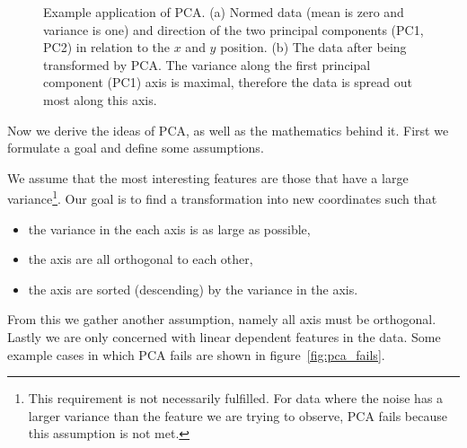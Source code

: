 \begin{figure}
	\centering
	\begin{subfigure}{0.45\linewidth}
		
		\caption{}
		\label{fig:some_nice_data_pc}
	\end{subfigure}
	\hfill
	\begin{subfigure}{0.45\linewidth}
		
		\caption{}
		\label{fig:some_nice_data_pca}
	\end{subfigure}
	
	\caption{Example application of PCA. \newline (a) Normed data (mean is zero and variance is one) and direction of the two principal components (PC1, PC2) in relation to the $x$ and $y$ position. \newline (b) The data after being transformed by PCA. The variance along the first principal component (PC1) axis is maximal, therefore the data is spread out most along this axis.}
	\label{fig:pca_example}
\end{figure}

Now we derive the ideas of PCA, as well as the mathematics behind it. First we formulate a goal and define some assumptions.

We assume that the most interesting features are those that have a large variance\footnote{This requirement is not necessarily fulfilled. For data where the noise has a larger variance than the feature we are trying to observe, PCA fails because this assumption is not met.}. Our goal is to find a transformation into new coordinates such that
\begin{itemize}
	\item the variance in the each axis is as large as possible,
	\item the axis are all orthogonal to each other,
	\item the axis are sorted (descending) by the variance in the axis.
\end{itemize}

From this we gather another assumption, namely all axis must be orthogonal. Lastly we are only concerned with linear dependent features in the data. Some example cases in which PCA fails are shown in figure~\ref{fig:pca_fails}.

\newpage

